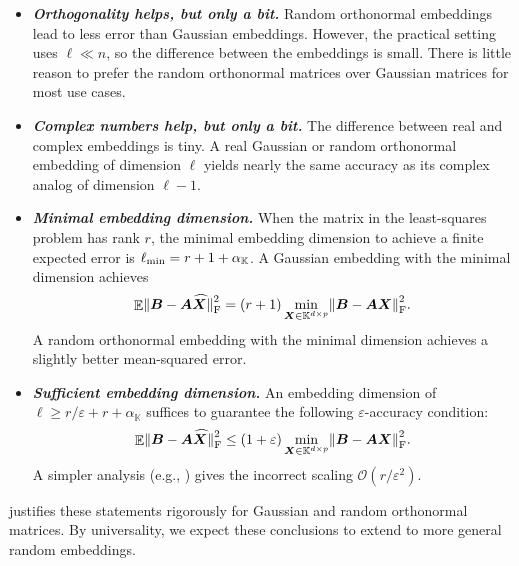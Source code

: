 \documentclass[11pt]{article}
\newcommand{\field}{\mathbb{K}}
\newcommand{\mat}[1]{\boldsymbol{#1}}
\newcommand{\norm}[1]{\mleft\| #1 \mright\|}
\DeclareMathOperator{\expect}{\mathbb{E}}
\newcommand{\order}{\mathcal{O}}
\newcommand{\hatbold}[1]{%
  \skew{4}\widehat{\smash{\boldsymbol{#1}}\mathstrut}}
\newcommand{\Xhat}{\smash{\hatbold{X}}}
\theoremstyle{definition}
\numberwithin{equation}{section}
\begin{document}
\begin{itemize}
    \item \textbf{\textit{Orthogonality helps, but only a bit.}}
    Random orthonormal embeddings lead to less error than Gaussian embeddings.
    However, the practical setting uses $\ell\ll n$, so the difference between the embeddings is small.
    There is little reason to prefer the random orthonormal matrices over Gaussian matrices for most use cases.
    \item \textit{\textbf{Complex numbers help, but only a bit.}}
    The difference between real and complex embeddings is tiny.
    A real Gaussian or random orthonormal embedding of dimension $\ell$ yields nearly the same accuracy as its complex analog of dimension $\ell-1$.
    \item \textit{\textbf{Minimal embedding dimension.}}
    When the matrix in the least-squares problem has rank $r$, the minimal embedding dimension to achieve a finite expected error is $\ell_{\rm min} = r + 1 + \alpha_\field$.
    A Gaussian embedding with the minimal dimension achieves
    \begin{equation*}
        \expect \norm{\smash{\mat{B} - \mat{A}\Xhat}}_{\rm F}^2
        = (r + 1) \min_{\mat{X}\in\field^{d\times p}}\norm{\mat{B} - \mat{A}\mat{X}}_{\rm F}^2.
    \end{equation*}
    A random orthonormal embedding with the minimal dimension achieves a slightly better mean-squared error.
    \item \textit{\textbf{Sufficient embedding dimension.}}
    An embedding dimension of $\ell \ge r/\varepsilon + r + \alpha_\field$ suffices to guarantee the following $\varepsilon$-accuracy condition:
    \begin{equation*}
        \expect \norm{\smash{\mat{B} - \mat{A}\Xhat}}_{\rm F}^2 \le (1+\varepsilon) \min_{\mat{X}\in\field^{d\times p}}\norm{\mat{B} - \mat{A}\mat{X}}_{\rm F}^2.
    \end{equation*}
    A simpler analysis (e.g., \cite[Prop.~5.3]{KT24}) gives the incorrect scaling $\order(r/\varepsilon^2)$.
\end{itemize}
%
 justifies these statements rigorously for Gaussian and random orthonormal matrices.
By universality, we expect these conclusions to extend to more general random embeddings.
\end{document}
